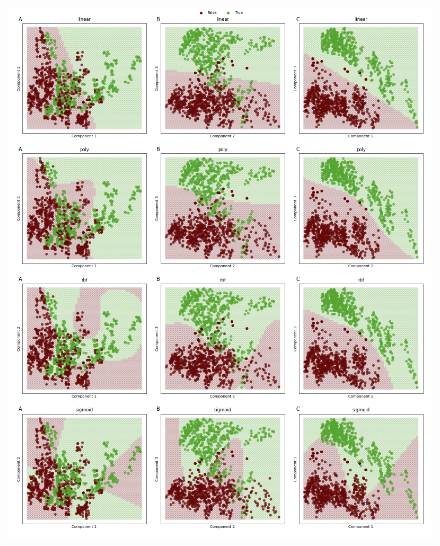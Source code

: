 \begin{figure}[H]
    \centering
    \includegraphics[width=16cm]{Graphics/Problema_04/SVM_PCA.png}
    \caption{}
    \label{fig:svm_pca}
\end{figure}